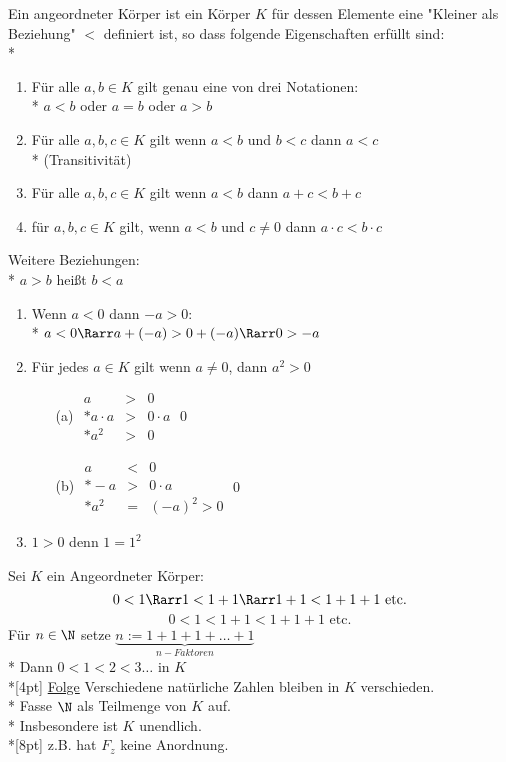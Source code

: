     Ein angeordneter Körper ist ein Körper $K$ für dessen Elemente eine "Kleiner als Beziehung" $<$ definiert ist, so dass folgende Eigenschaften erfüllt sind:\\*
    \begin{enumerate}
    \item{Für alle $a, b \in K$ gilt genau eine von drei Notationen:\\*
    $a < b$ oder $a = b$ oder $a > b$}
    \item{Für alle $a, b, c \in K$ gilt wenn $a < b$ und $b < c$ dann $a < c$\\* (Transitivität)}
    \item{Für alle $a, b, c \in K$ gilt wenn $a < b$ dann $a + c < b + c$}
    \item{für $a, b, c \in K$ gilt, wenn $a < b$ und $c \neq 0$ dann $a \cdot c < b \cdot c$}
    \end{enumerate}
	Weitere Beziehungen:\\*
	$a > b$ heißt $b < a$
	\begin{enumerate}
	\item{Wenn $a < 0$ dann $-a > 0$:\\*
	$a < 0 \Rarr a + (-a) > 0 + (-a) \Rarr 0 > -a$}
	\item{Für jedes $a \in K $ gilt wenn $a \neq 0$, dann $a^2 > 0$
	\begin{itemize}
	\item[(a)]{$\begin{array}{ccc}
	a &>& 0\\*
	a · a &>& 0 · a\\*
	a^2 &>& 0
	\end{array}$\qed}
	\item[(b)]{$\begin{array}{ccc}
		a &<& 0\\*
		-a &>& 0 · a\\*
		a^2 &=& (-a)^2 > 0
		\end{array}$\qed}
	\end{itemize}}
	\item{$1 > 0 $ denn $1 = 1^2$}
	\end{enumerate}
	Sei $K$ ein Angeordneter Körper:
	$$0 < 1 \Rarr 1 < 1 + 1 \Rarr 1 + 1 < 1 + 1 + 1 \text{ etc.}$$
	$$0 < 1 < 1 + 1 < 1 + 1 +1 \text{ etc.}$$
	Für $n \in \N$ setze $\underbrace{n:= 1 + 1 + 1 + … + 1}_{n-Faktoren}$\\*
	Dann $0 < 1 < 2 < 3 … $ in $K$\\*[4pt]
	\ul{Folge} Verschiedene natürliche Zahlen bleiben in $K$ verschieden.\\*
	Fasse $\N$ als Teilmenge von $K$ auf.\\*
	Insbesondere ist $K$ unendlich.\\*[8pt]
	z.B. hat $F_z$ keine Anordnung.

